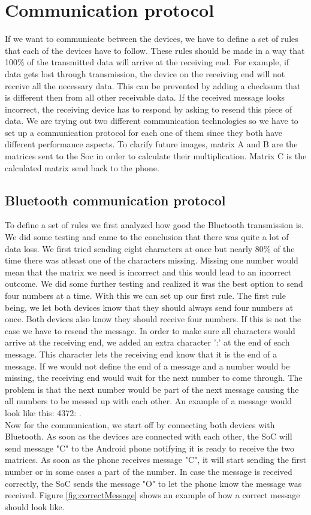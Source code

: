 \documentclass[a4paper, 11pt]{report}
\begin{document}
	
\section{Communication protocol}
If we want to communicate between the devices, we have to define a set of rules that each of the devices have to follow. These rules should be made in a way that 100\% of the transmitted data will arrive at the receiving end. For example, if data gets lost through transmission, the device on the receiving end will not receive all the necessary data. This can be prevented by adding a checksum that is different then from all other receivable data. If the received message looks incorrect, the receiving device has to respond by asking to resend this piece of data. We are trying out two different communication technologies so we have to set up a communication protocol for each one of them since they both have different performance aspects. To clarify future images, matrix A and B are the matrices sent to the Soc in order to calculate their multiplication. Matrix C is the calculated matrix send back to the phone.

	\subsection{Bluetooth communication protocol}\label{subsec:bluetoothProtocol}
To define a set of rules we first analyzed how good the Bluetooth transmission is. We did some testing and came to the conclusion that there was quite a lot of data loss. We first tried sending eight characters at once but nearly 80\% of the time there was atleast one of the characters missing. Missing one number would mean that the matrix we need is incorrect and this would lead to an incorrect outcome. We did some further testing and realized it was the best option to send four numbers at a time. With this we can set up our first rule. The first rule being, we let both devices know that they should always send four numbers at once. Both devices also know they should receive four numbers. If this is not the case we have to resend the message.
In order to make sure all characters would arrive at the receiving end, we added an extra character ':' at the end of each message. This character lets the receiving end know that it is the end of a message. If we would not define the end of a message and a number would be missing, the receiving end would wait for the next number to come through. The problem is that the next number would be part of the next message causing the all numbers to be messed up with each other. An example of a message would look like this: 4372: .\\
Now for the communication, we start off by connecting both devices with Bluetooth. As soon as the devices are connected with each other, the SoC will send message "C" to the Android phone notifying it is ready to receive the two matrices. As soon as the phone receives message "C", it will start sending the first number or in some cases a part of the number. In case the message is received correctly, the SoC sends the message "O" to let the phone know the message was received. Figure \ref{fig:correctMessage} shows an example of how a correct message should look like.
\end{document}

